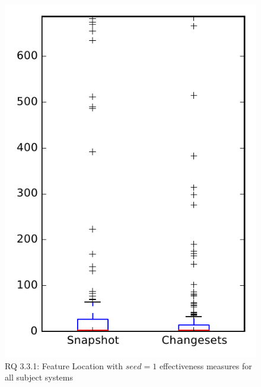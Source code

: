 
\begin{figure}
\centering
\includegraphics[height=0.4\textheight]{figures/flt_seed/rq1_overview_1}
\caption{RQ 3.3.1: Feature Location with $seed=1$ effectiveness measures for all subject systems}
\label{fig:flt_seed:rq1:overview}
\end{figure}

